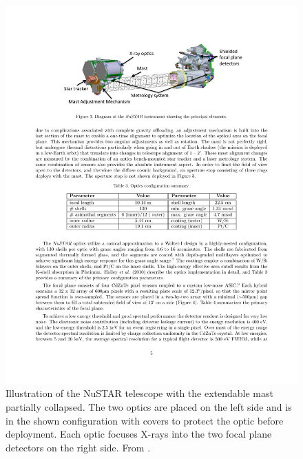 \begin{figure}[!htp] %
	\centering	\includegraphics[width=0.8\linewidth]{figures/introduction/nustar.pdf}
	\caption{\footnotesize Illustration of the NuSTAR telescope with the extendable mast partially collapsed. The two optics are placed on the left side and is in the shown configuration with covers to protect the optic before deployment. Each optic focuses X-rays into the two focal plane detectors on the right side. From \cite{Harrison:2010gu}.}
	\label{fig:nustar}
\end{figure}

